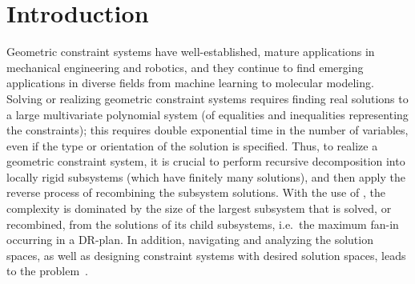\section{Introduction}
\label{sec:intro}

\newcommand{\seedefs}{(formally defined in \ref{sec:appendix:defs})}
\newcommand{\seedefsb}{(see \ref{sec:appendix:defs} for definitions)}
\newcommand{\seedefsc}{See \ref{sec:appendix:defs} for formal definitions}
\newcommand{\seedefsd}{see \ref{sec:appendix:defs} for definitions}
\newcommand{\seedefsprelim}{(formally defined in Section \ref{sec:prelim:defs})}



Geometric constraint systems have well-established, mature applications in mechanical engineering and  robotics, and they continue to find emerging applications in diverse fields from machine learning to molecular modeling.  Solving or realizing geometric constraint systems requires finding real solutions to a large multivariate polynomial system (of equalities and inequalities representing the constraints); this requires double exponential time in the number of variables, even if the type or orientation of the solution is specified.
Thus, to realize a geometric constraint system, it is crucial to perform recursive decomposition into locally rigid subsystems (which have finitely many solutions), and then apply the reverse process of recombining the subsystem solutions.
With the use of , the complexity is dominated by the size of the largest subsystem that is solved, or recombined, from the solutions of its child subsystems, i.e.\ the maximum fan-in occurring in a DR-plan.
In addition, navigating and analyzing the solution spaces, as well as designing constraint systems with desired solution spaces, leads to the  problem~\cite{sitharam2005combinatorial, hoffman2001decompositionI, hoffman2001decompositionII}.

